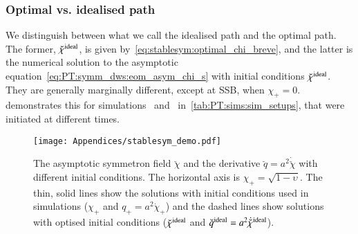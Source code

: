 \subsubsection{Optimal vs. idealised path}
    We distinguish between what we call the idealised path and the optimal path. The former, $\breve{\chi}^\mathrm{ideal}$, is given by~\cref{eq:stablesym:optimal_chi_breve}, and the latter is the numerical solution to the asymptotic equation~\cref{eq:PT:symm_dws:eom_asym_chi_s} with initial conditions $\breve{\chi}^\mathrm{ideal}$. They are generally marginally different, except at SSB, when $\chi_+ = 0$.  demonstrates this for simulations~ and~ in~\cref{tab:PT:sims:sim_setups}, that were initiated at different times.
    \begin{figure}[h!]
        \centering
        \texttt{[image: Appendices/stablesym\_demo.pdf]}
        \caption{The asymptotic symmetron field $\breve{\chi}$ and the derivative $\breve{q}=a^2\dot{\breve{\chi}}$ with different initial conditions. The horizontal axis is $\chi_+=\sqrt{1-\upsilon}$. The thin, solid lines show the solutions with initial conditions used in simulations ($\chi_+$ and $q_+= a^2 \dot{\chi}_+$) and the dashed lines show solutions with optised initial conditions ($\breve{\chi}^\mathrm{ideal}$ and $\breve{q}^\mathrm{ideal} =a^2 \dot{\breve{\chi}}^\mathrm{ideal}$).}
        \label{fig:stablesym:computation:stablesym_demo}
    \end{figure}%

